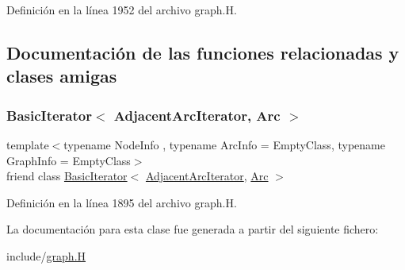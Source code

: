 Definición en la línea 1952 del archivo graph.\+H.



\subsection{Documentación de las funciones relacionadas y clases amigas}
\mbox{\label{class_designar_1_1_digraph_1_1_adjacent_arc_iterator_a73ad70d76f3331ee4b07451db1347918}} 
\subsubsection{\texorpdfstring{Basic\+Iterator$<$ Adjacent\+Arc\+Iterator, Arc $>$}{BasicIterator< AdjacentArcIterator, Arc >}}
{\footnotesize\ttfamily template$<$typename Node\+Info , typename Arc\+Info  = Empty\+Class, typename Graph\+Info  = Empty\+Class$>$ \\
friend class \hyperlink{class_designar_1_1_basic_iterator}{Basic\+Iterator}$<$ \hyperlink{class_designar_1_1_digraph_1_1_adjacent_arc_iterator}{Adjacent\+Arc\+Iterator}, \hyperlink{class_designar_1_1_digraph_a0ceb278671f2a535c00fddccdeafd69f}{Arc} $>$\hspace{0.3cm}{\ttfamily [friend]}}



Definición en la línea 1895 del archivo graph.\+H.



La documentación para esta clase fue generada a partir del siguiente fichero\+:\begin{DoxyCompactItemize}
\item 
include/\hyperlink{graph_8_h}{graph.\+H}\end{DoxyCompactItemize}
